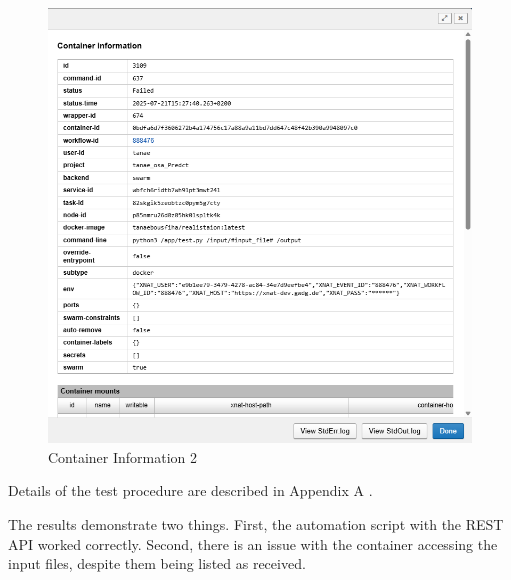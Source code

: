 \begin{figure}
    \centering
    \includegraphics[width=0.9\linewidth]{en/content/Container information 2.png}
    \caption{Container Information 2}
    \label{fig:enter-label}
\end{figure}

Details of the test procedure are described in Appendix A \cite{bousfiha2025appendix}.

The results demonstrate two things. First, the automation script with the REST API worked correctly. Second, there is an issue with the container accessing the input files, despite them being listed as received.
